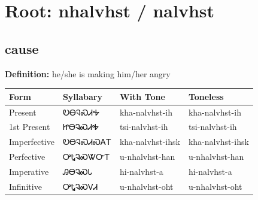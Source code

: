 \documentclass{article}%
\begin{document}
%
\normalsize%
\section*{Root: nhalvhst / nalvhst}%
\subsection*{cause}%
\textbf{Definition: }%
he/she is making him/her angry%
\\[0.5em]%
\begin{tabular}{|l|l|l|l|}%
\hline%
\textbf{Form}&\textbf{Syllabary}&\textbf{With Tone}&\textbf{Toneless}\\%
\hline%
Present&ᎧᎾᎸᏍᏗᎭ&kha{-}nalvhst{-}ih&kha{-}nalvhst{-}ih\\%
1st Present&ᏥᎾᎸᏍᏗᎭ&tsi{-}nalvhst{-}ih&tsi{-}nalvhst{-}ih\\%
Imperfective&ᎧᎾᎸᏍᏗᏍᎪᎢ&kha{-}nalvhst{-}ihsk&kha{-}nalvhst{-}ihsk\\%
Perfective&ᎤᎿᎸᏍᏔᏅᎢ&u{-}nhalvhst{-}han&u{-}nhalvhst{-}han\\%
Imperative&ᎯᎾᎸᏍᏓ&hi{-}nalvhst{-}a&hi{-}nalvhst{-}a\\%
Infinitive&ᎤᎿᎸᏍᏙᏗ&u{-}nhalvhst{-}oht&u{-}nhalvhst{-}oht\\%
\hline%
\end{tabular}%
\\[1em]%
\end{document}
